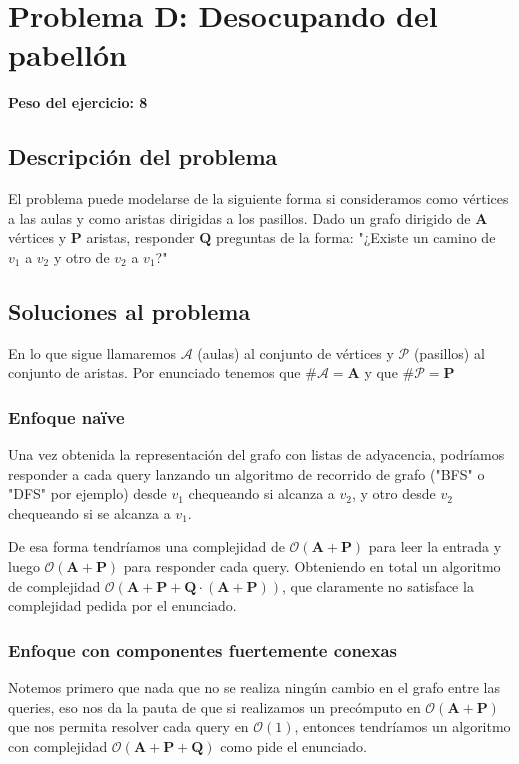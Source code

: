 \newpage{}
\section{Problema D: Desocupando del pabellón}
\textbf{Peso del ejercicio: 8}
\subsection{Descripción del problema}

El problema puede modelarse de la siguiente forma si consideramos como vértices a las aulas y como aristas dirigidas a los pasillos. Dado un grafo dirigido de $\textbf{A}$ vértices y $\textbf{P}$ aristas, responder $\textbf{Q}$ preguntas de la forma: "¿Existe un camino de $v_1$ a $v_2$ y otro de $v_2$ a $v_1$?"
\subsection{Soluciones al problema}

En lo que sigue llamaremos $\mathcal{A}$ (aulas) al conjunto de vértices y $\mathcal{P}$ (pasillos) al conjunto de aristas. Por enunciado tenemos que $\# \mathcal{A} = \textbf{A}$ y que $\# \mathcal{P} = \textbf{P}$

\subsubsection{Enfoque naïve}

Una vez obtenida la representación del grafo con listas de adyacencia, podríamos responder a cada query lanzando un algoritmo de recorrido de grafo ("BFS" o "DFS" por ejemplo) desde $v_1$ chequeando si alcanza a $v_2$, y otro desde $v_2$ chequeando si se alcanza a $v_1$. 

De esa forma tendríamos una complejidad de  $\mathcal{O} \left (\textbf{A} + \textbf{P} \right ) $ para leer la entrada y luego  $\mathcal{O} \left (\textbf{A} + \textbf{P} \right )$ para responder cada query. Obteniendo en total un algoritmo de complejidad $\mathcal{O} \left (\textbf{A} + \textbf{P} + \textbf{Q} \cdot \left ( \textbf{A} + \textbf{P} \right ) \right )$, que claramente no satisface la complejidad pedida por el enunciado.

\subsubsection{Enfoque con componentes fuertemente conexas}

Notemos primero que nada que no se realiza ningún cambio en el grafo entre las queries, eso nos da la pauta de que si realizamos un precómputo en $\mathcal{O}(\textbf{A} + \textbf{P})$ que nos permita resolver cada query en $\mathcal{O}(1)$, entonces tendríamos un algoritmo con complejidad $\mathcal{O}(\textbf{A} + \textbf{P} + \textbf{Q})$ como pide el enunciado.

